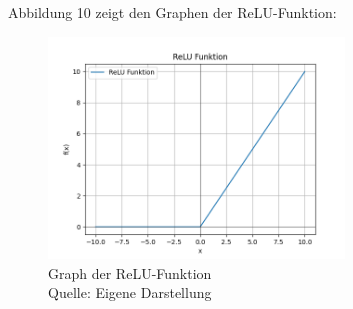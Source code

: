 Abbildung 10 zeigt den Graphen der ReLU-Funktion:
\nopagebreak
\begin{figure}[H]
	\centering
	\includegraphics[width=0.7\textwidth]{Bilder/ReLU} 
	\caption[Graph der ReLU-Funktion]{Graph der ReLU-Funktion\\ Quelle: Eigene Darstellung}
\end{figure}

